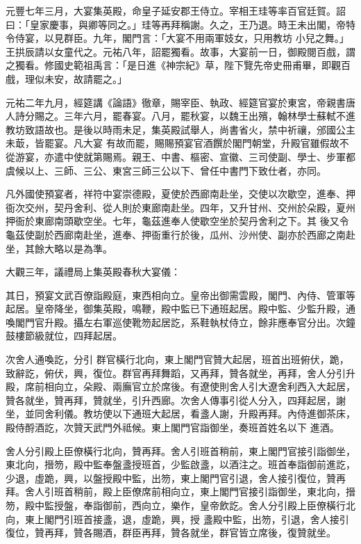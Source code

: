 \begin{pinyinscope}
 元豐七年三月，大宴集英殿，命皇子延安郡王侍立。宰相王珪等率百官廷賀。詔曰：「皇家慶事，與卿等同之。」珪等再拜稱謝。久之，王乃退。時王未出閣，帝特令侍宴，以見群臣。九年，閣門言：「大宴不用兩軍妓女，只用教坊
 小兒之舞。」王拱辰請以女童代之。元祐八年，詔罷獨看。故事，大宴前一日，御殿閱百戲，謂之獨看。修國史範祖禹言：「是日進《神宗紀》草，陛下覽先帝史冊甫畢，即觀百戲，理似未安，故請罷之。」



 元祐二年九月，經筵講《論語》徹章，賜宰臣、執政、經筵官宴於東宮，帝親書唐人詩分賜之。三年六月，罷春宴。八月，罷秋宴，以魏王出殯，翰林學士蘇軾不進教坊致語故也。是後以時雨未足，集英殿試舉人，尚書省火，禁中祈禳，邠國公主未菆，皆罷宴。凡大宴
 有故而罷，賜賜預宴官酒饌於閣門朝堂，升殿官雖假故不從游宴，亦遣中使就第賜焉。親王、中書、樞密、宣徽、三司使副、學士、步軍都虞候以上、三師、三公、東宮三師三公以下、曾任中書門下致仕者，亦同。



 凡外國使預宴者，祥符中宴崇德殿，夏使於西廊南赴坐，交使以次歇空，進奉、押衙次交州，契丹舍利、從人則於東廊南赴坐。四年，又升甘州、交州於朵殿，夏州押衙於東廊南頭歇空坐。七年，龜茲進奉人使歇空坐於契丹舍利之下。其
 後又令龜茲使副於西廊南赴坐，進奉、押衙重行於後，瓜州、沙州使、副亦於西廊之南赴坐，其餘大略以是為準。



 大觀三年，議禮局上集英殿春秋大宴儀：



 其日，預宴文武百僚詣殿庭，東西相向立。皇帝出御需雲殿，閣門、內侍、管軍等起居。皇帝降坐，御集英殿，鳴鞭，殿中監已下通班起居。殿中監、少監升殿，通喚閣門官升殿。攝左右軍巡使靴笏起居訖，系鞋執杖侍立，餘非應奉官分出。次鐘鼓樓節級就位，四拜起居。



 次舍人通喚訖，分引
 群官橫行北向，東上閣門官贊大起居，班首出班俯伏，跪，致辭訖，俯伏，興，復位。群官再拜舞蹈，又再拜，贊各就坐，再拜，舍人分引升殿，席前相向立，朵殿、兩廡官立於席後。有遼使則舍人引大遼舍利西入大起居，贊各就坐，贊再拜，贊就坐，引升西廊。次舍人傳事引從人分入，四拜起居，謝坐，並同舍利儀。教坊使以下通班大起居，看盞人謝，升殿再拜。內侍進御茶床，殿侍酹酒訖，次贊天武門外祗候。東上閣門官詣御坐，奏班首姓名以下
 進酒。



 舍人分引殿上臣僚橫行北向，贊再拜。舍人引班首稍前，東上閣門官接引詣御坐，東北向，搢笏，殿中監奉盤盞授班首，少監啟盞，以酒注之。班首奉詣御前進訖，少退，虛跪，興，以盤授殿中監，出笏，東上閣門官引退，舍人接引復位，贊再拜。舍人引班首稍前，殿上臣僚席前相向立，東上閣門官接引詣御坐，東北向，搢笏，殿中監授盤，奉詣御前，西向立，樂作，皇帝飲訖。舍人分引殿上臣僚橫行北向，東上閣門引班首接盞，退，虛跪，興，授
 盞殿中監，出笏，引退，舍人接引復位，贊再拜，贊各賜酒，群臣再拜，贊各就坐，群官皆立席後，復贊就坐。




\end{pinyinscope}
